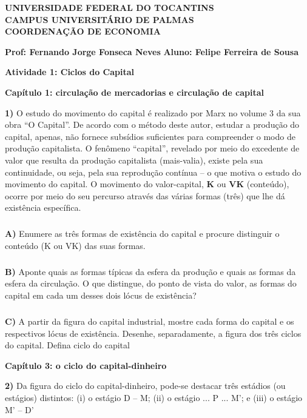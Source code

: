 \documentclass[a4paper, 12pt]{article} %
\begin{document}
\begin{center}
\textbf{UNIVERSIDADE FEDERAL DO TOCANTINS\\
	CAMPUS UNIVERSITÁRIO DE PALMAS\\
	COORDENAÇÃO DE ECONOMIA}
\end{center}

\textbf{Prof: Fernando Jorge Fonseca Neves }
\singlespacing
\textbf{Aluno: Felipe Ferreira de Sousa}
\begin{center}
\textbf{Atividade 1: Ciclos do Capital}
\end{center}

\par \textbf{Capítulo 1: circulação de mercadorias e circulação de capital}
\vspace{0.5cm}
\par \textbf{1)} O estudo do movimento do capital é realizado por Marx no volume 3 da sua obra “O Capital”. De acordo com o método deste autor, estudar a produção do capital, apenas, não fornece subsídios suficientes para compreender o modo de produção capitalista. O fenômeno “capital”, revelado por meio do excedente de valor que resulta da produção capitalista (mais-valia), existe pela sua
continuidade, ou seja, pela sua reprodução contínua – o que motiva o estudo do movimento do capital. O movimento do valor-capital, \textbf{K} ou \textbf{VK} (conteúdo), ocorre por meio do seu percurso através das várias
formas (três) que lhe dá existência específica.

\subparagraph{} \textbf{A)} Enumere as três formas de existência do capital e procure distinguir o conteúdo (K ou VK) das
suas formas.

\subparagraph{} \textbf{B)} Aponte quais as formas típicas da esfera da produção e quais as formas da esfera da circulação.
O que distingue, do ponto de vista do valor, as formas do capital em cada um desses dois lócus
de existência?

\subparagraph{} \textbf{C)} A partir da figura do capital industrial, mostre cada forma do capital e os respectivos lócus de
existência. Desenhe, separadamente, a figura dos três ciclos do capital. Defina ciclo do capital
\vspace{0.5cm}
\par \textbf{Capítulo 3: o ciclo do capital-dinheiro}
\vspace{0.5cm}
\par \textbf{2)} Da figura do ciclo do capital-dinheiro, pode-se destacar três estádios (ou estágios) distintos: (i) o
estágio D – M; (ii) o estágio ... P ... M’; e (iii) o estágio M’ – D’
\end{document}
